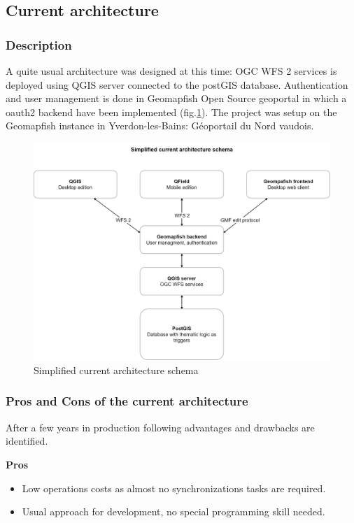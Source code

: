 \documentclass[runningheads]{llncs}
\begin{document}
\subsection{Current architecture}

\subsubsection{Description}

A quite usual architecture was designed at this time: OGC WFS 2 services is deployed using QGIS\cite{ref_article4} server connected to the postGIS database. Authentication and user management is done in Geomapfish Open Source geoportal\cite{ref_article1} in which a oauth2 backend have been implemented (fig.\ref{fig3}). The project was setup on the Geomapfish instance in Yverdon-les-Bains: Géoportail du Nord vaudois\cite{ref_article2}.

\begin{figure}
	\includegraphics[width=\textwidth]{architecture.drawio.png}
	\caption{Simplified current architecture schema} \label{fig3}
\end{figure}


\subsubsection{Pros and Cons of the current architecture}

After a few years in production following advantages and drawbacks are identified.

\textbf{Pros} 
\begin{itemize}
	\item Low operations costs as almost no synchronizations tasks are required.
	\item Usual approach for development, no special programming skill needed. 
\end{itemize}
\end{document}

